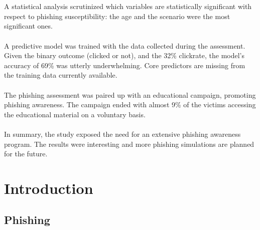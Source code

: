 \documentclass[a4paper]{article}
\begin{document}
\\ \\
A statistical analysis scrutinized which variables are statistically significant with respect to phishing susceptibility: the age and the scenario were the most significant ones.
\\ \\
A predictive model was trained with the data collected during the assessment. Given the binary outcome (clicked or not), and the 32\% clickrate, the model's accuracy of 69\% was utterly underwhelming. Core predictors are missing from the training data currently available.
\\ \\
The phishing assessment was paired up with an educational campaign, promoting phishing awareness. The campaign ended with almost 9\% of the victims accessing the educational material on a voluntary basis.
\\ \\
In summary, the study exposed the need for an extensive phishing awareness program. The results were interesting and more phishing simulations are planned for the future.

\newpage

\vspace*{\fill}

\newpage

\tableofcontents

\newpage

\listoffigures

\newpage

\listoftables

\newpage

\section{Introduction}

\subsection{Phishing}
\end{document}
